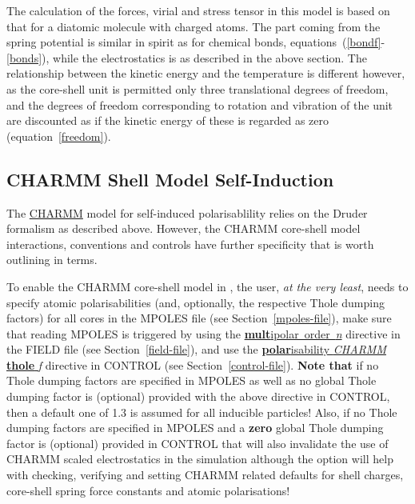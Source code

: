 The calculation of the forces, virial and stress tensor in this model is based on that for a diatomic molecule
with charged atoms.  The part coming from the spring potential is
similar in spirit as for chemical bonds, equations~(\ref{bondf}-\ref{bonds}),
while the electrostatics is as described in the above section.
The relationship between the kinetic energy and the temperature is
different however, as the core-shell unit is permitted only three
translational degrees of freedom, and the degrees of freedom
corresponding to rotation and vibration of the unit are discounted
as if the kinetic energy of these is regarded as zero (equation~\ref{freedom}).

\subsection{CHARMM Shell Model Self-Induction}

The \href{https://www.charmm.org/}{CHARMM} model for
self-induced polarisablility relies on the Druder formalism as
described above.  However, the CHARMM core-shell model interactions,
conventions and controls have further specificity \cite{mackerell-16a}
that is worth outlining in \D terms.

To enable the CHARMM core-shell model in \D, the user, {\em at the very
least}, needs to specify atomic polarisabilities (and, optionally, the
respective Thole dumping factors) for all cores in the MPOLES file
(see Section~\ref{mpoles-file}), make sure that reading MPOLES is
triggered by using the \underline{{\bf mult}ipolar~order~{\em n}}
directive in the FIELD file (see Section~\ref{field-file}), and use
the \underline{{\bf polar}isability {\em CHARMM} {\bf thole} {\em f}}
directive in CONTROL (see Section~\ref{control-file}).  {\bf Note that}
if no Thole dumping factors are specified in MPOLES as well as no global
Thole dumping factor is (optional) provided with the above directive
in CONTROL, then a default one of 1.3 is assumed for all inducible
particles!  Also, if no Thole dumping factors are specified in MPOLES
and a {\bf zero} global Thole dumping factor is (optional) provided
in CONTROL that will also invalidate the use of CHARMM scaled
electrostatics in the simulation although the option will help with
checking, verifying and setting CHARMM related defaults for shell
charges, core-shell spring force constants and atomic polarisations!

